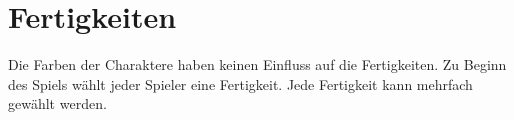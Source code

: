 \section{Fertigkeiten}

Die Farben der Charaktere haben keinen Einfluss auf die Fertigkeiten. Zu Beginn des Spiels wählt jeder Spieler eine
Fertigkeit. Jede Fertigkeit kann mehrfach gewählt werden.







